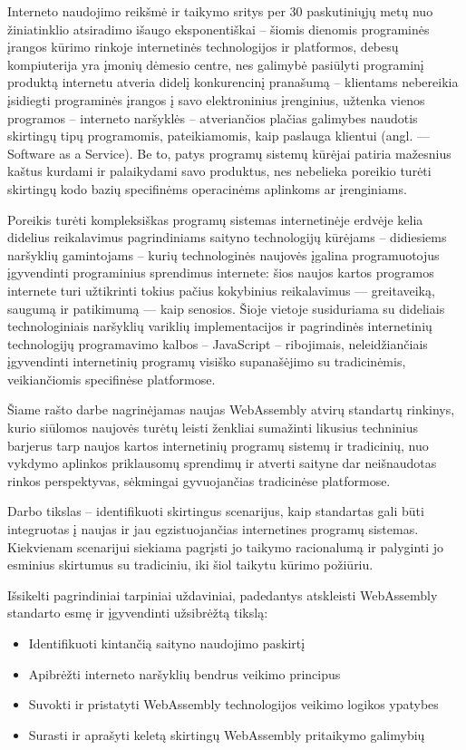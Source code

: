 \documentclass{VUMIFPSkursinis}
\begin{document}
\setcounter{page}{2}
\tableofcontents

Interneto naudojimo reikšmė ir taikymo sritys per 30 paskutiniųjų metų nuo žiniatinklio atsiradimo išaugo 
eksponentiškai – šiomis dienomis programinės įrangos kūrimo rinkoje internetinės technologijos ir 
platformos, debesų kompiuterija yra įmonių dėmesio centre, nes galimybė pasiūlyti programinį 
produktą internetu atveria didelį konkurencinį pranašumą – klientams nebereikia įsidiegti 
programinės įrangos į savo elektroninius įrenginius, užtenka vienos programos – interneto 
naršyklės – atveriančios plačias galimybes naudotis skirtingų tipų programomis, pateikiamomis, 
kaip paslauga klientui (angl. — Software as a Service). Be to, patys programų sistemų kūrėjai 
patiria mažesnius kaštus kurdami ir palaikydami savo produktus, nes nebelieka poreikio turėti 
skirtingų kodo bazių specifinėms operacinėms aplinkoms ar įrenginiams.

Poreikis turėti kompleksiškas programų sistemas internetinėje erdvėje kelia didelius 
reikalavimus pagrindiniams saityno technologijų kūrėjams – didiesiems naršyklių gamintojams – 
kurių technologinės naujovės įgalina programuotojus įgyvendinti programinius sprendimus 
internete: šios naujos kartos programos internete turi užtikrinti tokius pačius kokybinius 
reikalavimus — greitaveiką, saugumą ir patikimumą — kaip senosios. Šioje vietoje susiduriama 
su dideliais technologiniais naršyklių variklių implementacijos ir pagrindinės internetinių 
technologijų programavimo kalbos – JavaScript – ribojimais, neleidžiančiais įgyvendinti 
internetinių programų visiško supanašėjimo su tradicinėmis, veikiančiomis specifinėse 
platformose. 

Šiame rašto darbe nagrinėjamas naujas WebAssembly atvirų standartų rinkinys, kurio siūlomos naujovės turėtų leisti ženkliai sumažinti likusius techninius barjerus tarp 
naujos kartos internetinių programų sistemų ir tradicinių, nuo vykdymo aplinkos priklausomų 
sprendimų ir atverti saityne dar neišnaudotas rinkos perspektyvas, sėkmingai gyvuojančias
tradicinėse platformose. 

Darbo tikslas – identifikuoti skirtingus scenarijus, kaip standartas 
gali būti integruotas į naujas ir jau egzistuojančias internetines programų sistemas. Kiekvienam scenarijui siekiama pagrįsti jo taikymo racionalumą ir palyginti jo esminius skirtumus su tradiciniu, iki šiol taikytu kūrimo požiūriu. 

Išsikelti pagrindiniai tarpiniai uždaviniai, padedantys atskleisti WebAssembly standarto esmę ir įgyvendinti užsibrėžtą tikslą:
\begin{itemize}
    \item Identifikuoti kintančią saityno naudojimo paskirtį
    \item Apibrėžti interneto naršyklių bendrus veikimo principus
    \item Suvokti ir pristatyti WebAssembly technologijos veikimo logikos ypatybes
    \item Surasti ir aprašyti keletą skirtingų WebAssembly pritaikymo galimybių
\end{itemize}
\end{document}
